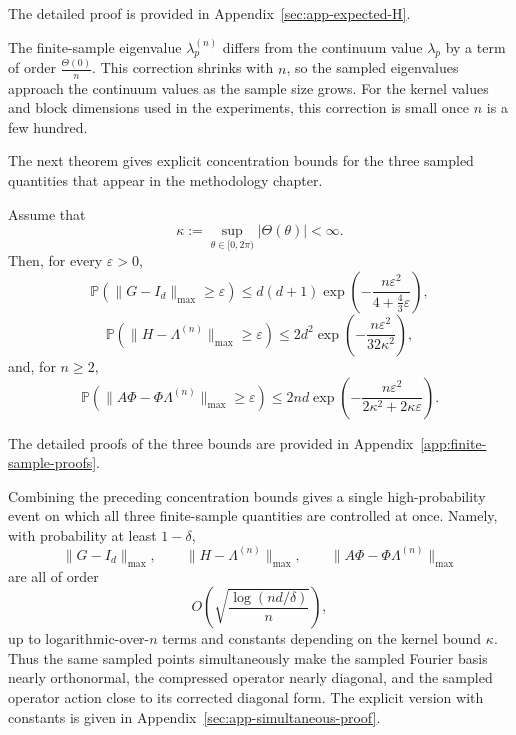 The detailed proof is provided in Appendix~\ref{sec:app-expected-H}.

The finite-sample eigenvalue \(\lambda_p^{(n)}\) differs from the continuum
value \(\lambda_p\) by a term of order \(\frac{\Theta(0)}{n}\). This correction
shrinks with \(n\), so the sampled eigenvalues approach the continuum values as
the sample size grows. For the kernel values and block dimensions used in the
experiments, this correction is small once \(n\) is a few hundred.

The next theorem gives explicit concentration bounds for the three sampled quantities that
appear in the methodology chapter.

\begin{theorem}
	\label{thm:results-finite-sample-concentration}
	Assume that
	\begin{equation}
		\kappa:=\sup_{\theta\in[0,2\pi)}|\Theta(\theta)|<\infty.
		\label{eq:results-kappa}
	\end{equation}
	Then, for every \(\varepsilon>0\),
	\begin{equation}
		\mathbb P\!\left(\|G-I_d\|_{\max}\ge \varepsilon\right)
		\le
		d(d+1)\exp\!\left(-\frac{n\varepsilon^2}{4+\frac43\varepsilon}\right),
		\label{eq:results-gram-concentration}
	\end{equation}
	\begin{equation}
		\mathbb P\!\left(\|H-\Lambda^{(n)}\|_{\max}\ge \varepsilon\right)
		\le
		2d^2\exp\!\left(-\frac{n\varepsilon^2}{32\kappa^2}\right),
		\label{eq:results-H-concentration}
	\end{equation}
	and, for \(n\ge 2\),
	\begin{equation}
		\mathbb P\!\left(\|A\Phi-\Phi\Lambda^{(n)}\|_{\max}\ge \varepsilon\right)
		\le
		2nd\exp\!\left(-\frac{n\varepsilon^2}{2\kappa^2+2\kappa\varepsilon}\right).
		\label{eq:results-APhi-concentration}
	\end{equation}
\end{theorem}

The detailed proofs of the three bounds are provided in
Appendix~\ref{app:finite-sample-proofs}.

Combining the preceding concentration bounds gives a single high-probability
event on which all three finite-sample quantities are controlled at once.
Namely, with probability at least \(1-\delta\),
\[
	\|G-I_d\|_{\max},
	\qquad
	\|H-\Lambda^{(n)}\|_{\max},
	\qquad
	\|A\Phi-\Phi\Lambda^{(n)}\|_{\max}
\]
are all of order
\[
	O \left(  \sqrt{\frac{\log(nd/\delta)}{n}}\right) ,
\]
up to logarithmic-over-\(n\) terms and constants depending on the kernel bound
\(\kappa\). Thus the same sampled points simultaneously make the sampled
Fourier basis nearly orthonormal, the compressed operator nearly diagonal, and
the sampled operator action close to its corrected diagonal form. The explicit
version with constants is given in Appendix~\ref{sec:app-simultaneous-proof}.

